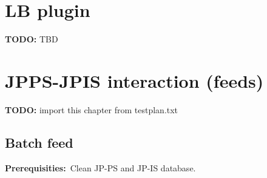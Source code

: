 \documentclass{egee}
\def\req{\noindent\textbf{Prerequisities:}}
\def\todo#1{\textbf{TODO:} #1}
\begin{document}
\section{LB plugin}
\todo{TBD}

\section{JPPS-JPIS interaction (feeds)}

\todo{import this chapter from testplan.txt}




\subsection{Batch feed}

\req\ Clean JP-PS and JP-IS database.
\end{document}
